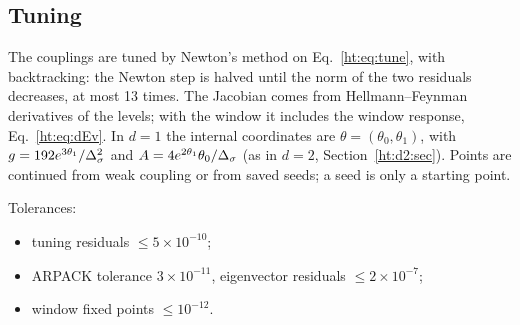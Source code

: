 \subsection{Tuning}
The couplings are tuned by Newton's method on Eq.~\eqref{ht:eq:tune}, with backtracking: the Newton step is halved
until the norm of the two residuals decreases, at most 13 times. The Jacobian comes from Hellmann--Feynman
derivatives of the levels; with the window it includes the window response, Eq.~\eqref{ht:eq:dEv}. In $d=1$ the
internal coordinates are $\theta=(\theta_0,\theta_1)$, with $g=192e^{3\theta_1}/\Delta_\sigma^2$ and
$A=4e^{2\theta_1}\theta_0/\Delta_\sigma$ (as in $d=2$, Section~\ref{ht:d2:sec}). Points are
continued from weak coupling or from saved seeds; a seed is only a starting point.

Tolerances:
\begin{itemize}
\item tuning residuals $\le5\times10^{-10}$;
\item ARPACK tolerance $3\times10^{-11}$, eigenvector residuals $\le2\times10^{-7}$;
\item window fixed points $\le10^{-12}$.
\end{itemize}
